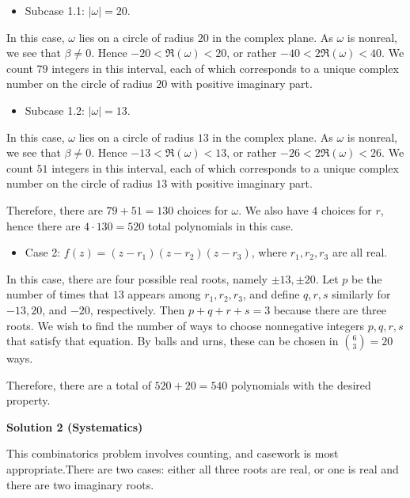 \begin{enumerate}
 
            \begin{itemize}
        \item Subcase 1.1: $|\omega|=20$.
            \end{itemize}
            In this case, $\omega$ lies on a circle of radius $20$ in the complex plane. As $\omega$ is nonreal, we see that $\beta\ne 0$.  Hence $-20<\Re{(\omega)}< 20$, or rather $-40<2\Re{(\omega)}< 40$. We count $79$ integers in this interval, each of which corresponds to a unique complex number on the circle of radius $20$ with positive imaginary part.

 
            \begin{itemize}
        \item Subcase 1.2: $|\omega|=13$.
            \end{itemize}
            In this case, $\omega$ lies on a circle of radius $13$ in the complex plane. As $\omega$ is nonreal, we see that $\beta\ne 0$.  Hence $-13<\Re{(\omega)}< 13$, or rather $-26<2\Re{(\omega)}< 26$. We count $51$ integers in this interval, each of which corresponds to a unique complex number on the circle of radius $13$ with positive imaginary part.

 Therefore, there are $79+51=130$ choices for $\omega$. We also have $4$ choices for $r$, hence there are $4\cdot 130=520$ total polynomials in this case.

 
            \begin{itemize}
        \item Case 2: $f(z)=(z-r_1)(z-r_2)(z-r_3)$, where $r_1,r_2,r_3$ are all real.
            \end{itemize}
            In this case, there are four possible real roots, namely $\pm 13, \pm20$. Let $p$ be the number of times that $13$ appears among $r_1,r_2,r_3$, and define $q,r,s$ similarly for $-13,20$, and $-20$, respectively. Then $p+q+r+s=3$ because there are three roots. We wish to find the number of ways to choose nonnegative integers $p,q,r,s$ that satisfy that equation. By balls and urns, these can be chosen in $\binom{6}{3}=20$ ways.

 Therefore, there are a total of $520+20=\boxed{540}$ polynomials with the desired property.

 



\textbf{Solution 2 (Systematics)}

This combinatorics problem involves counting, and casework is most appropriate.There are two cases: either all three roots are real, or one is real and there are two imaginary roots.


\end{enumerate}
